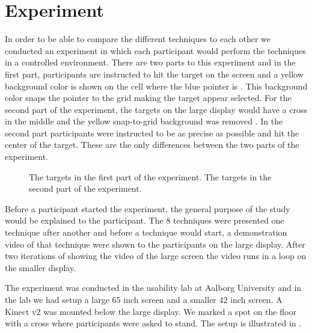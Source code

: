 \section{Experiment} \label{sec:experiment}
In order to be able to compare the different techniques to each other we conducted an experiment in which each participant would perform the techniques in a controlled environment.
There are two parts to this experiment and in the first part, participants are instructed to hit the target on the screen and a yellow background color is shown on the cell where the blue pointer is .
This background color snaps the pointer to the grid making the target appear selected.
For the second part of the experiment, the targets on the large display would have a cross in the middle and the yellow snap-to-grid background was removed .
In the second part participants were instructed to be as precise as possible and hit the center of the target.
These are the only differences between the two parts of the experiment.

\begin{figure}[H]
\centering
{}
\hspace{0.05\columnwidth}
\caption{\protect{} The targets in the first part of the experiment. \protect{} The targets in the second part of the experiment.}
\end{figure}

Before a participant started the experiment, the general purpose of the study would be explained to the participant.
The 8 techniques were presented one technique after another and before a technique would start, a demonstration video of that technique were shown to the participants on the large display.
After two iterations of showing the video of the large screen the video runs in a loop on the smaller display.

The experiment was conducted in the usability lab at Aalborg University and in the lab we had setup a large 65 inch screen and a smaller 42 inch screen. 
A Kinect v2 was mounted below the large display.
We marked a spot on the floor with a cross where participants were asked to stand.
The setup is illustrated in .

